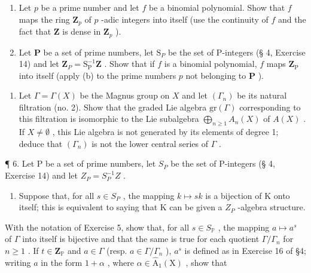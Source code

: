 \begin{enumerate}
\def\labelenumi{(\alph{enumi})}
\setcounter{enumi}{1}
\item
  Let \(p\) be a prime number and let \(f\) be a binomial polynomial. Show that \(f\) maps the ring \(\mathbf{Z}_p\) of \(p\) -adic integers into itself (use the continuity of \(f\) and the fact that \(\mathbf{Z}\) is dense in \(\mathbf{Z}_p\) ).
\item
  Let \(\mathbf{P}\) be a set of prime numbers, let \(\mathrm{S}_P\) be the set of P-integers (§ 4, Exercise 14) and let \(\mathbf{Z}_P = \mathrm{S}_{\mathrm{P}}^{-1}\mathbf{Z}\) . Show that if \(f\) is a binomial polynomial, \(f\) maps \(\mathbf{Z}_{\mathrm{P}}\) into itself (apply (b) to the prime numbers \(p\) not belonging to \(\mathbf{P}\) ).
\end{enumerate}

\begin{enumerate}
\def\labelenumi{\arabic{enumi}.}
\setcounter{enumi}{4}
\tightlist
\item
  Let \(\Gamma = \Gamma(X)\) be the Magnus group on \(X\) and let \((\Gamma_n)\) be its natural filtration (no. 2). Show that the graded Lie algebra \(\mathrm{gr}(\Gamma)\) corresponding to this filtration is isomorphic to the Lie subalgebra \(\bigoplus_{n\geqslant 1}A_n(X)\) of \(A(X)\) . If \(X\neq \emptyset\) , this Lie algebra is not generated by its elements of degree 1; deduce that \((\Gamma_n)\) is not the lower central series of \(\Gamma\) .
\end{enumerate}

¶ 6. Let P be a set of prime numbers, let \(S_P\) be the set of P-integers (§ 4, Exercise 14) and let \(Z_P = S_P^{-1}Z\) .

\begin{enumerate}
\def\labelenumi{(\alph{enumi})}
\tightlist
\item
  Suppose that, for all \(s \in S_{P}\) , the mapping \(k \mapsto sk\) is a bijection of K onto itself; this is equivalent to saying that K can be given a \(Z_{P}\) -algebra structure.
\end{enumerate}

With the notation of Exercise 5, show that, for all \(s \in S_{\mathbb{P}}\) , the mapping \(a \mapsto a^s\) of \(\Gamma\) into itself is bijective and that the same is true for each quotient \(\Gamma / \Gamma_n\) for \(n \geqslant 1\) . If \(t \in \mathbf{Z}_{\mathbb{P}}\) and \(a \in \Gamma\) (resp. \(a \in \Gamma / \Gamma_n\) ), \(a^s\) is defined as in Exercise 16 of §4; writing \(a\) in the form \(1 + \alpha\) , where \(\alpha \in \hat{\mathrm{A}}_1(\mathrm{X})\) , show that

